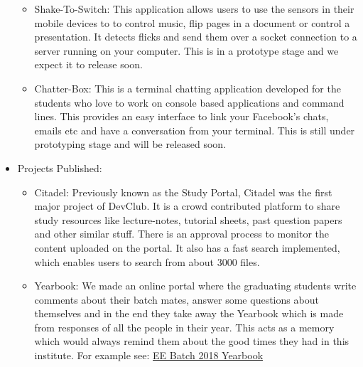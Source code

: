 \documentclass[11pt,a4paper]{article}
\begin{document}
\begin{itemize}
\begin{itemize}
            \item Shake-To-Switch: This application allows users to use the sensors in their mobile devices to to control music, flip pages in a document or control a presentation. It detects flicks and send them over a socket connection to a server running on your computer. This is in a prototype stage and we expect it to release soon.
            
            \item Chatter-Box: This is a terminal chatting application developed for the students who love to work on console based applications and command lines. This provides an easy interface to link your Facebook's chats, emails etc and have a conversation from your terminal. This is still under prototyping stage and will be released soon.
            
            
        \end{itemize}
        \item Projects Published: \label{projpublished}
        \begin{itemize}
            \item Citadel: Previously known as the Study Portal, Citadel was the first major project of DevClub. It is a crowd contributed platform to share study resources like lecture-notes, tutorial sheets, past question papers and other similar stuff. There is an approval process to monitor the content uploaded on the portal. It also has a fast search implemented, which enables users to search from about 3000 files.
            
            \item Yearbook: We made an online portal where the graduating students write comments about their batch mates, answer some questions about themselves and in the end they take away the Yearbook which is made from responses of all the people in their year. This acts as a memory which would always remind them about the good times they had in this institute. For example see:
            \href{https://devclub.in/yearbooks/ee.pdf}{EE Batch 2018 Yearbook}
        \end{itemize}
    \end{itemize}
\end{document}
